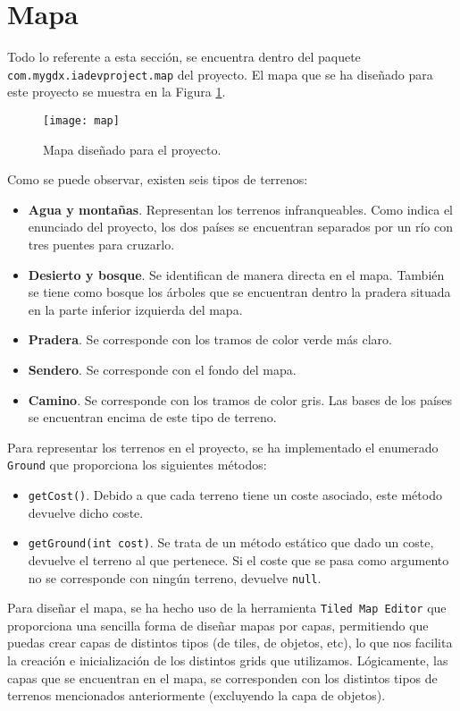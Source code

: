 \medskip
\section{Mapa}
Todo lo referente a esta sección, se encuentra dentro del paquete \texttt{com.mygdx.iadevproject.map} del proyecto. El mapa que se ha diseñado para este proyecto se muestra en la Figura \ref{mapa:mapa}.
\begin{figure}[!th]
\texttt{[image: map]}
\centering
\caption{Mapa diseñado para el proyecto.}
\label{mapa:mapa}
\end{figure}

Como se puede observar, existen seis tipos de terrenos:
\begin{itemize}
 \item \textbf{Agua y montañas}. Representan los terrenos infranqueables. Como indica el enunciado del proyecto, los dos países se encuentran separados por un río con tres puentes para cruzarlo.
 \item \textbf{Desierto y bosque}. Se identifican de manera directa en el mapa. También se tiene como bosque los árboles que se encuentran dentro la pradera situada en la parte inferior izquierda del mapa.
 \item \textbf{Pradera}. Se corresponde con los tramos de color verde más claro.
 \item \textbf{Sendero}. Se corresponde con el fondo del mapa.
 \item \textbf{Camino}. Se corresponde con los tramos de color gris. Las bases de los países se encuentran encima de este tipo de terreno.
\end{itemize}

Para representar los terrenos en el proyecto, se ha implementado el enumerado \texttt{Ground} que proporciona los siguientes métodos:
\begin{itemize}
 \item \texttt{getCost()}. Debido a que cada terreno tiene un coste asociado, este método devuelve dicho coste.
 \item \texttt{getGround(int cost)}. Se trata de un método estático que dado un coste, devuelve el terreno al que pertenece. Si el coste que se pasa como argumento no se corresponde con ningún terreno, devuelve \texttt{null}.
\end{itemize}

Para diseñar el mapa, se ha hecho uso de la herramienta \texttt{Tiled Map Editor} \cite{tiledMap} que proporciona una sencilla forma de diseñar mapas por capas, permitiendo que puedas crear capas de distintos tipos (de tiles, de objetos, etc), lo que nos facilita la creación e inicialización de los distintos grids que utilizamos. Lógicamente, las capas que se encuentran en el mapa, se corresponden con los distintos tipos de terrenos mencionados anteriormente (excluyendo la capa de objetos). \\

